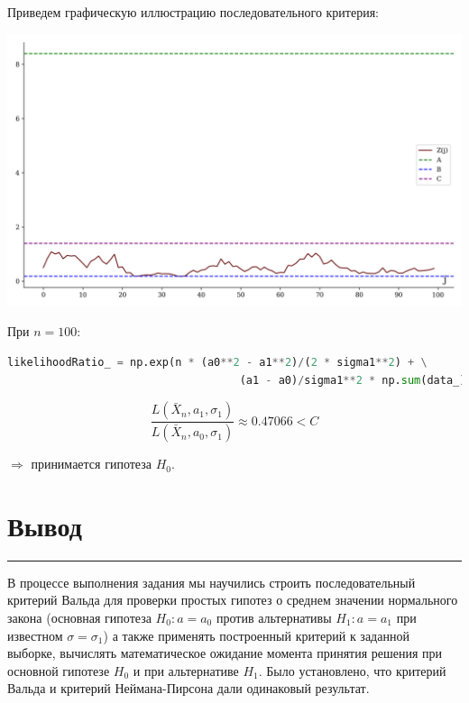 \documentclass[a4paper, 14pt]{extarticle}
\begin{document}
Приведем графическую иллюстрацию последовательного критерия: 

\begin{center}
    \includegraphics[width=\textwidth, height=\textheight, keepaspectratio]{iterative_crit_A_B_C} \\
\end{center}

При $n = 100$:

\begin{center}
  \begin{lstlisting}[language=Python]
    likelihoodRatio_ = np.exp(n * (a0**2 - a1**2)/(2 * sigma1**2) + \
                                    (a1 - a0)/sigma1**2 * np.sum(data_))
  \end{lstlisting}
\end{center}

\vspace{-20pt}

\begin{equation*}
    \frac{L(\bar{X}_n, a_1, \sigma_1)}{L(\bar{X}_n, a_0, \sigma_1)} \approx 0.47066 < C
\end{equation*}

\vspace{10pt}

$\Rightarrow$ принимается гипотеза $H_0$.

\newpage

\section*{Вывод}\vspace{-20pt}\rule{\linewidth}{0.1mm}

В процессе выполнения задания мы научились строить последовательный критерий Вальда 
для проверки простых гипотез о среднем значении нормального закона 
(основная гипотеза $H_0: a=a_0$  против альтернативы $H_1:a=a_1$ при известном 
$\sigma=\sigma_1$) а также применять построенный критерий к заданной выборке, 
вычислять математическое ожидание момента принятия решения при основной гипотезе $H_0$ 
и при альтернативе $H_1$. Было установлено, что критерий Вальда и критерий Неймана-Пирсона 
дали одинаковый результат.
\end{document}
